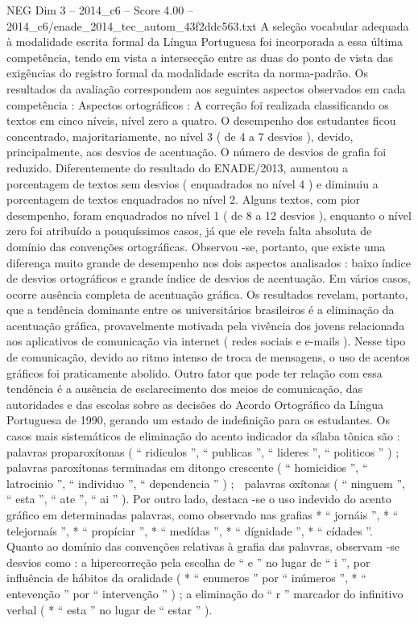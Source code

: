 \begin{textsample}{NEG Dim 3 – 2014\_c6 – Score 4.00 – 2014\_c6/enade\_2014\_tec\_autom\_43f2ddc563.txt}
A seleção vocabular adequada à modalidade escrita formal da Língua Portuguesa foi incorporada a essa última competência, tendo em vista a intersecção entre as duas do ponto de vista das exigências do registro formal da modalidade escrita da norma-padrão.
Os resultados da avaliação correspondem aos seguintes aspectos observados em cada competência : Aspectos ortográficos : A correção foi realizada classificando os textos em cinco níveis, nível zero a quatro.
O desempenho dos estudantes ficou concentrado, majoritariamente, no nível 3 ( de 4 a 7 desvios ), devido, principalmente, aos desvios de acentuação.
O número de desvios de grafia foi reduzido.
Diferentemente do resultado do ENADE/2013, aumentou a porcentagem de textos sem desvios ( enquadrados no nível 4 ) e diminuiu a porcentagem de textos enquadrados no nível 2.
Alguns textos, com pior desempenho, foram enquadrados no nível 1 ( de 8 a 12 desvios ), enquanto o nível zero foi atribuído a pouquíssimos casos, já que ele revela falta absoluta de domínio das convenções ortográficas.
Observou -se, portanto, que existe uma diferença muito grande de desempenho nos dois aspectos analisados : baixo índice de desvios ortográficos e grande índice de desvios de acentuação.
Em vários casos, ocorre ausência completa de acentuação gráfica.
Os resultados revelam, portanto, que a tendência dominante entre os universitários brasileiros é a eliminação da acentuação gráfica, provavelmente motivada pela vivência dos jovens relacionada aos aplicativos de comunicação via internet ( redes sociais e e-mails ).
Nesse tipo de comunicação, devido ao ritmo intenso de troca de mensagens, o uso de acentos gráficos foi praticamente abolido.
Outro fator que pode ter relação com essa tendência é a ausência de esclarecimento dos meios de comunicação, das autoridades e das escolas sobre as decisões do Acordo Ortográfico da Língua Portuguesa de 1990, gerando um estado de indefinição para os estudantes.
Os casos mais sistemáticos de eliminação do acento indicador da sílaba tônica são :  palavras proparoxítonas ( “ ridiculos ”, “ publicas ”, “ lideres ”, “ politicos ” ) ;  palavras paroxítonas terminadas em ditongo crescente ( “ homicidios ”, “ latrocinio ”, “ individuo ”, “ dependencia ” ) ;  palavras oxítonas ( “ ninguem ”, “ esta ”, “ ate ”, “ ai ” ).
Por outro lado, destaca -se o uso indevido do acento gráfico em determinadas palavras, como observado nas grafias * “ jornáis ”, * “ telejornaís ”, * “ propíciar ”, * “ medídas ”, * “ dígnidade ”, * “ cídades ”.
Quanto ao domínio das convenções relativas à grafia das palavras, observam -se desvios como : a hipercorreção pela escolha de “ e ” no lugar de “ i ”, por influência de hábitos da oralidade ( * “ enumeros ” por “ inúmeros ”, * “ entevenção ” por “ intervenção ” ) ; a eliminação do “ r ” marcador do infinitivo verbal ( * “ esta ” no lugar de “ estar ” ).

\end{textsample}
